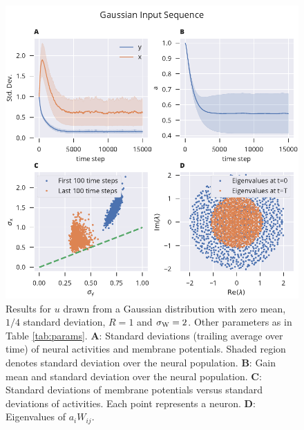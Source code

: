 \documentclass[12pt]{article}
\begin{document}
\begin{figure}[ht]
	\includegraphics{../../plots/alternative_mech/composite.pdf}
	\caption{Results for $u$ drawn from a Gaussian distribution with zero mean, $1/4$ standard deviation, $R=1$ and $\sigma_{\rm W}=2$. Other parameters as in Table \ref{tab:params}. {\bf A}: Standard deviations (trailing average over time) of neural activities and membrane potentials. Shaded region denotes standard deviation over the neural population. {\bf B}: Gain mean and standard deviation over the neural population. {\bf C}: Standard deviations of membrane potentials versus standard deviations of activities. Each point represents a neuron. {\bf D}: Eigenvalues of $a_i W_{ij}$.}
	\label{fig:results_gaussian_sequ}
\end{figure}
\end{document}
